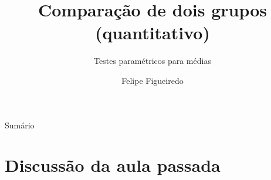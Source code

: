 \documentclass{beamer}
\title%
{Comparação de dois grupos (quantitativo)}
\subtitle
{Testes paramétricos para médias} %
\author%
{Felipe Figueiredo}%
\institute[INTO] %
{Instituto Nacional de Traumatologia e Ortopedia
}
\date%
{}
\begin{document}
\begin{frame}
  \titlepage
\end{frame}

\begin{frame}{Sumário}
  \tableofcontents
\end{frame}








\section{Discussão da aula passada}
\end{document}
